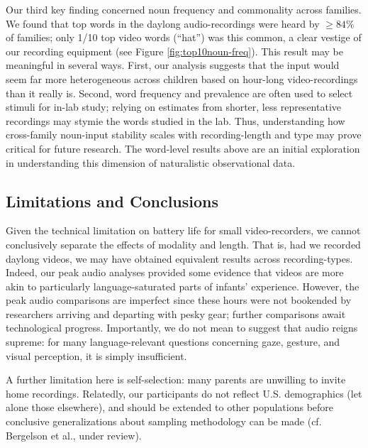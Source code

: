 \documentclass[man]{apa6}
\theoremstyle{definition}
\theoremstyle{definition}
\theoremstyle{definition}
\theoremstyle{remark}
\begin{document}
Our third key finding concerned noun frequency and commonality across
families. We found that top words in the daylong audio-recordings were
heard by \(\geq84\%\) of families; only 1/10 top video words
(\enquote{hat}) was this common, a clear vestige of our recording
equipment (see Figure \ref{fig:top10noun-freq}). This result may be
meaningful in several ways. First, our analysis suggests that the input
would seem far more heterogeneous across children based on hour-long
video-recordings than it really is. Second, word frequency and
prevalence are often used to select stimuli for in-lab study; relying on
estimates from shorter, less representative recordings may stymie the
words studied in the lab. Thus, understanding how cross-family
noun-input stability scales with recording-length and type may prove
critical for future research. The word-level results above are an
initial exploration in understanding this dimension of naturalistic
observational data.

\subsection{Limitations and
Conclusions}\label{limitations-and-conclusions}

Given the technical limitation on battery life for small
video-recorders, we cannot conclusively separate the effects of modality
and length. That is, had we recorded daylong videos, we may have
obtained equivalent results across recording-types. Indeed, our peak
audio analyses provided some evidence that videos are more akin to
particularly language-saturated parts of infants' experience. However,
the peak audio comparisons are imperfect since these hours were not
bookended by researchers arriving and departing with pesky gear; further
comparisons await technological progress. Importantly, we do not mean to
suggest that audio reigns supreme: for many language-relevant questions
concerning gaze, gesture, and visual perception, it is simply
insufficient.

A further limitation here is self-selection: many parents are unwilling
to invite home recordings. Relatedly, our participants do not reflect
U.S. demographics (let alone those elsewhere), and should be extended to
other populations before conclusive generalizations about sampling
methodology can be made (cf. Bergelson et al., under review).
\end{document}
